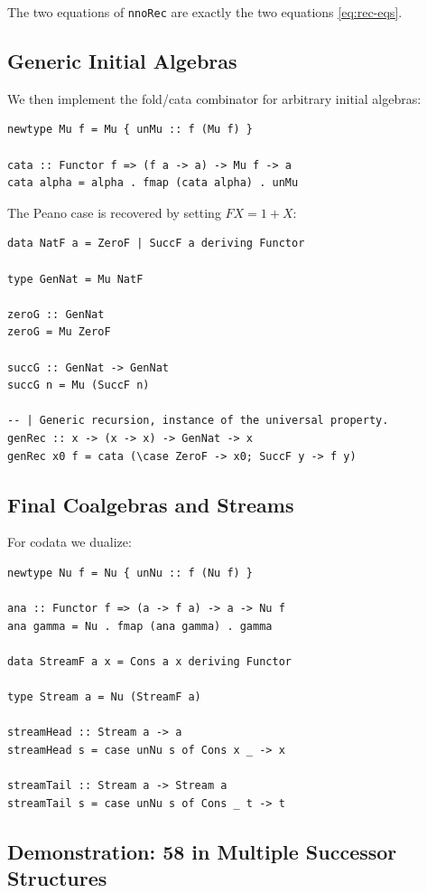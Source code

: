 \documentclass[12pt]{article}
\theoremstyle{definition}
\theoremstyle{remark}
\begin{document}
The two equations of \texttt{nnoRec} are exactly the two equations \eqref{eq:rec-eqs}.

\subsection{Generic Initial Algebras}

We then implement the fold/cata combinator for arbitrary initial algebras:

\begin{lstlisting}
newtype Mu f = Mu { unMu :: f (Mu f) }

cata :: Functor f => (f a -> a) -> Mu f -> a
cata alpha = alpha . fmap (cata alpha) . unMu
\end{lstlisting}

The Peano case is recovered by setting $F X = 1 + X$:

\begin{lstlisting}
data NatF a = ZeroF | SuccF a deriving Functor

type GenNat = Mu NatF

zeroG :: GenNat
zeroG = Mu ZeroF

succG :: GenNat -> GenNat
succG n = Mu (SuccF n)

-- | Generic recursion, instance of the universal property.
genRec :: x -> (x -> x) -> GenNat -> x
genRec x0 f = cata (\case ZeroF -> x0; SuccF y -> f y)
\end{lstlisting}

\subsection{Final Coalgebras and Streams}

For codata we dualize:

\begin{lstlisting}
newtype Nu f = Nu { unNu :: f (Nu f) }

ana :: Functor f => (a -> f a) -> a -> Nu f
ana gamma = Nu . fmap (ana gamma) . gamma

data StreamF a x = Cons a x deriving Functor

type Stream a = Nu (StreamF a)

streamHead :: Stream a -> a
streamHead s = case unNu s of Cons x _ -> x

streamTail :: Stream a -> Stream a
streamTail s = case unNu s of Cons _ t -> t
\end{lstlisting}

\subsection{Demonstration: 58 in Multiple Successor Structures}
\end{document}
